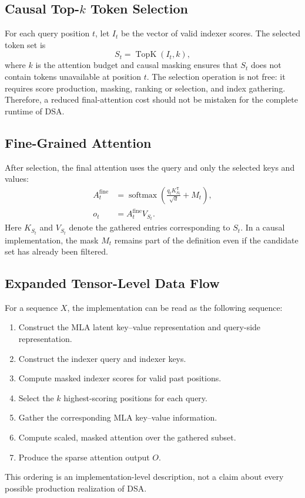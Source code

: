 \documentclass[11pt]{article}
\newcommand{\TopK}{\operatorname{TopK}}
\newcommand{\softmax}{\operatorname{softmax}}
\begin{document}
\subsection{Causal Top-$k$ Token Selection}

For each query position $t$, let $I_t$ be the vector of valid indexer scores.
The selected token set is
\begin{equation}
    S_t = \TopK(I_t,k),
\end{equation}
where $k$ is the attention budget and causal masking ensures that $S_t$ does
not contain tokens unavailable at position $t$. The selection operation is
not free: it requires score production, masking, ranking or selection, and
index gathering. Therefore, a reduced final-attention cost should not be
mistaken for the complete runtime of DSA.

\subsection{Fine-Grained Attention}

After selection, the final attention uses the query and only the selected keys
and values:
\begin{align}
    A_t^{\mathrm{fine}} &=
    \softmax\!\left(\frac{q_tK_{S_t}^{\mathsf T}}{\sqrt d}+M_t\right),\\
    o_t &= A_t^{\mathrm{fine}}V_{S_t}.
\end{align}
Here $K_{S_t}$ and $V_{S_t}$ denote the gathered entries corresponding to
$S_t$. In a causal implementation, the mask $M_t$ remains part of the
definition even if the candidate set has already been filtered.

\subsection{Expanded Tensor-Level Data Flow}

For a sequence $X$, the implementation can be read as the following sequence:
\begin{enumerate}[leftmargin=*]
    \item Construct the MLA latent key--value representation and query-side
          representation.
    \item Construct the indexer query and indexer keys.
    \item Compute masked indexer scores for valid past positions.
    \item Select the $k$ highest-scoring positions for each query.
    \item Gather the corresponding MLA key--value information.
    \item Compute scaled, masked attention over the gathered subset.
    \item Produce the sparse attention output $O$.
\end{enumerate}
This ordering is an implementation-level description, not a claim about every
possible production realization of DSA.
\end{document}
